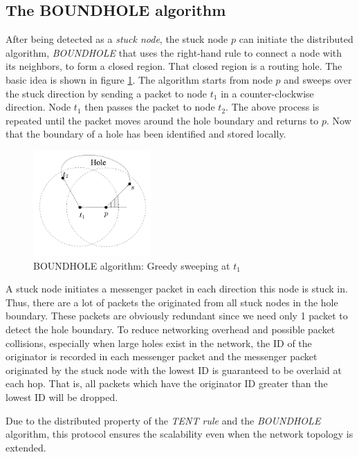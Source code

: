 \subsection{The BOUNDHOLE algorithm}
After being detected as a \emph{stuck node}, the stuck node $p$ can initiate the distributed algorithm, \emph{BOUNDHOLE} that uses the right-hand rule to connect a node with its neighbors, to form a closed region. That closed region is a routing hole. The basic idea is shown in figure \ref{boundhole}. The algorithm starts from node $p$ and sweeps over the stuck direction by sending a packet to node $t_1$ in a counter-clockwise direction. Node $t_1$ then passes the packet to node $t_2$. The above process is repeated until the packet moves around the hole boundary and returns to $p$. Now that the boundary of a hole has been identified and stored locally. 

\begin{figure}[!htb]
\centering
\includegraphics[width=0.4\textwidth]{Chapter3/Chapter3Figs/fig-boundhole.png} %
\caption{BOUNDHOLE algorithm: Greedy sweeping at $t_1$}
\label{boundhole}
\end{figure}

A stuck node initiates a messenger packet in each direction this node is stuck in. Thus, there are a lot of packets the originated from all stuck nodes in the hole boundary. These packets are obviously redundant since we need only 1 packet to detect the hole boundary. To reduce networking overhead and possible packet collisions, especially when large holes exist in the network, the ID of the originator is recorded in each messenger packet and the messenger packet originated by the stuck node with the lowest ID is guaranteed to be overlaid at each hop. That is, all packets which have the originator ID greater than the lowest ID will be dropped.

Due to the distributed property of the \emph{TENT rule} and the \emph{BOUNDHOLE} algorithm, this protocol ensures the scalability even when the network topology is extended.

